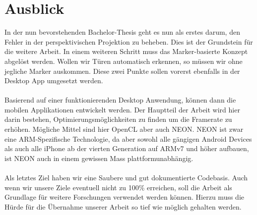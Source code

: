 \documentclass[main.tex]{subfiles}
\begin{document}
\section{Ausblick}

In der nun bevorstehenden Bachelor-Thesis geht es nun als erstes darum, den Fehler in der perspektivischen Projektion zu beheben. Dies ist der Grundstein für die weitere Arbeit. In einem weiteren Schritt muss das Marker-basierte Konzept abgelöst werden. Wollen wir Türen automatisch erkennen, so müssen wir ohne jegliche Marker auskommen. Diese zwei Punkte sollen vorerst ebenfalls in der Desktop App umgesetzt werden.
\paragraph{}
Basierend auf einer funktionierenden Desktop Anwendung, können dann die mobilen Applikationen entwickelt werden. Der Hauptteil der Arbeit wird hier darin bestehen, Optimierungsmöglichkeiten zu finden um die Framerate zu erhöhen. Mögliche Mittel sind hier OpenCL aber auch NEON. NEON ist zwar eine ARM-Spezifische Technologie, da aber sowohl alle gängigen Android Devices als auch alle iPhone ab der vierten Generation auf ARMv7 und höher aufbauen, ist NEON auch in einem gewissen Mass plattformunabhängig.
\paragraph{}
Als letztes Ziel haben wir eine Saubere und gut dokumentierte Codebasis. Auch wenn wir unsere Ziele eventuell nicht zu 100\% erreichen, soll die Arbeit als Grundlage für weitere Forschungen verwendet werden können. Hierzu muss die Hürde für die Übernahme unserer Arbeit so tief wie möglich gehalten werden.
\end{document}
